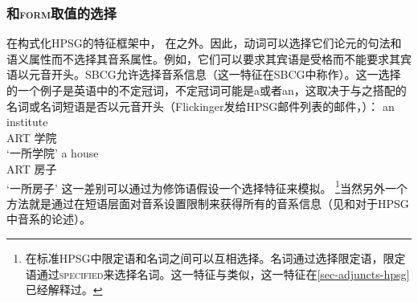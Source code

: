 \subsubsection{\phon 和\textsc{form}取值的选择}

在构式化HPSG的特征框架中， \phonvc 在\synsemc 之外。因此，动词可以选择它们论元的句法和语义属性而不选择其音系属性。例如，它们可以要求其宾语是受格而不能要求其宾语以元音开头。SBCG允许选择音系信息（这一特征在SBCG中称作\formc）。这一选择的一个例子是英语中的不定冠词，不定冠词可能是a或者an，这取决于与之搭配的名词或名词短语是否以元音开头（Flickinger发给HPSG邮件列表的邮件，）：
\eal
\ex 
\gll an institute\\
     ART 学院\\
\glt `一所学院'
\ex 
\gll a  house\\
     ART 房子\\
\glt `一所房子'
\zl
这一差别可以通过为修饰语假设一个选择特征来模拟。 \footnote{
  在标准HPSG中限定语和名词之间可以互相选择。名词通过\sprc 选择限定语，限定语通过\textsc{specified}来选择名词。这一特征与\modfc 类似，这一特征在\ref{sec-adjuncts-hpsg}已经解释过。
}当然另外一个方法就是通过在短语层面对音系设置限制来获得所有的音系信息（见\citealp{BK94b}和\citealp{Walther99a-u}对于HPSG中音系的论述）。

